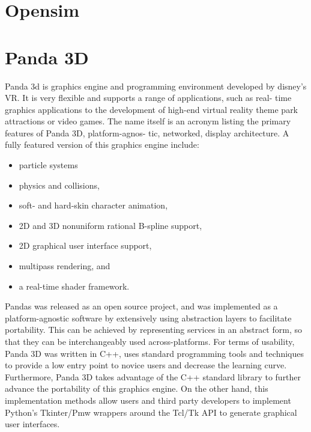 \documentclass[
	12pt, 
	a4paper, 
]{article}
\begin{document}
	\section{Opensim}
	\section{Panda 3D}
	Panda 3d is graphics engine and programming environment developed by disney's VR. It is very flexible and supports a range of applications, such as real-
	time graphics applications to the development of high-end virtual reality theme park attractions or video games. The name itself is an acronym listing the primary features of Panda 3D, platform-agnos- tic, networked, display architecture\cite{goslin2004panda3d}. A fully featured version of this graphics engine include\cite{goslin2004panda3d}:
	\begin{itemize}
		\item particle systems
		\item physics and collisions,
		\item soft- and hard-skin character animation,
		\item 2D and 3D nonuniform rational B-spline support,
		\item 2D graphical user interface support,
		\item multipass rendering, and
		\item a real-time shader framework.
	\end{itemize}
	Pandas was released as an open source project, and was implemented as a platform-agnostic software by extensively using abstraction layers to facilitate portability. This can be achieved by representing services in an abstract form, so that they can be interchangeably used across-platforms. For terms of usability, Panda 3D was written in C++, uses standard programming tools and techniques to provide a low entry point to novice users and decrease the learning curve. Furthermore, Panda 3D takes advantage of the C++ standard library to further advance the portability of this graphics engine. On the other hand, this implementation methods allow users and third party developers to implement Python’s Tkinter/Pmw wrappers around the Tcl/Tk API to generate graphical user interfaces\cite{goslin2004panda3d}.

	\printbibliography
\end{document}
